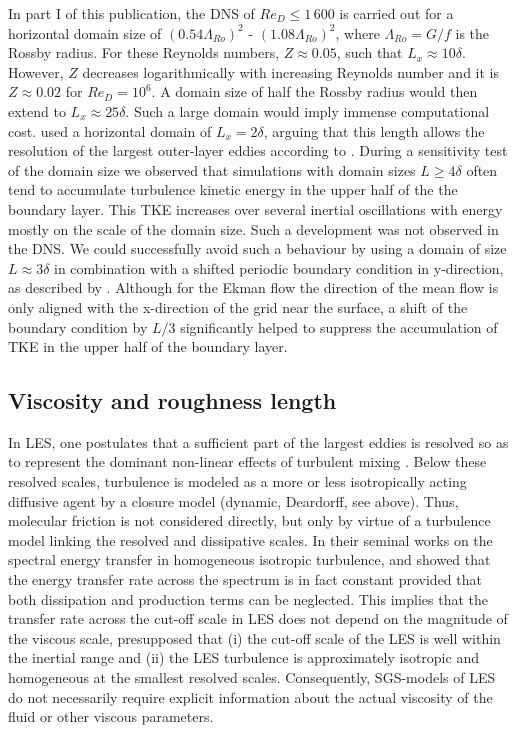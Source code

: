 \documentclass[a4paper,11pt]{article}
\begin{document}
In part I of this publication, the DNS of $Re_D\leq1\,600$ is carried out for a horizontal domain size of $(0.54\Lambda_{Ro})^2$ - $(1.08\Lambda_{Ro})^2$, where $\Lambda_{Ro}=G/f$ is the Rossby radius. For these Reynolds numbers, $Z\approx 0.05$, such that $L_x \approx 10 \delta$. However, $Z$ decreases logarithmically with increasing Reynolds number and it is $Z\approx 0.02$ for $Re_D=10^6$. A domain size of half the Rossby radius would then extend to $L_x\approx 25\delta$. Such a large domain would imply immense computational cost. \cite{spalart2008direct} used a horizontal domain of $L_x = 2\delta$, arguing that this length allows the resolution of the largest outer-layer eddies according to \cite{csanady1967resistance}. During a sensitivity test of the domain size we observed that simulations with domain sizes $L\geq 4\delta$ often tend to accumulate turbulence kinetic energy in the upper half of the the boundary layer. This TKE increases over several inertial oscillations with energy mostly on the scale of the domain size. Such a development was not observed in the DNS. We could successfully avoid such a behaviour by using a domain of size $L \approx 3\delta$ in combination with a shifted periodic boundary condition in y-direction, as described by \cite{munters2016shifted}. Although for the Ekman flow the direction of the mean flow is only aligned with the x-direction of the grid near the surface, a shift of the boundary condition by $L/3$ significantly helped to suppress the accumulation of TKE in the upper half of the boundary layer.

\subsection{Viscosity and roughness length}

In LES, one postulates that a sufficient part of the largest eddies is resolved so as to represent the dominant non-linear effects of turbulent mixing \citep{pope2004ten}. Below these resolved scales, turbulence is modeled as a more or less isotropically acting diffusive agent by a closure model (dynamic, Deardorff, see above). Thus, molecular friction is not considered directly, but only by virtue of a turbulence model linking the resolved and dissipative scales. In their seminal works on the spectral energy transfer in homogeneous isotropic turbulence, \cite{kolmogorov1941dissipation} and \cite{obukhov1941distribution} showed that the energy transfer rate across the spectrum is in fact constant provided that both dissipation and production terms can be neglected. This implies that the transfer rate across the cut-off scale in LES does not depend on the magnitude of the viscous scale, presupposed that (i) the cut-off scale of the LES is well within the inertial range and (ii) the LES turbulence is approximately isotropic and homogeneous at the smallest resolved scales. Consequently, SGS-models of LES do not necessarily require explicit information about the actual viscosity of the fluid or other viscous parameters.
\end{document}
